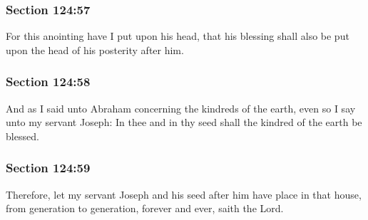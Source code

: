 	\subsubsection{Section 124:57} %
		\label{DC124-57}

		For this anointing have I put upon his head, that his blessing shall also be put upon the head of his posterity after him.


	\subsubsection{Section 124:58} %
		\label{DC124-58}

		And as I said unto Abraham concerning the kindreds of the earth, even so I say unto my servant Joseph: In thee and in thy seed shall the kindred of the earth be blessed.


	\subsubsection{Section 124:59} %
		\label{DC124-59}

		Therefore, let my servant Joseph and his seed after him have place in that house, from generation to generation, forever and ever, saith the Lord.


